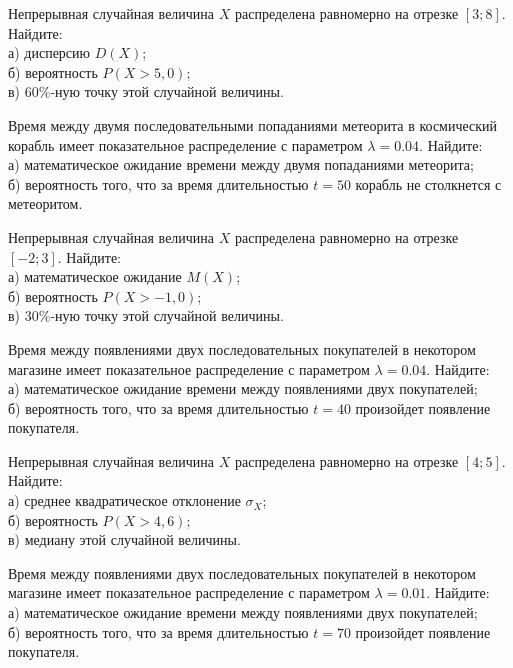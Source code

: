 \vfill

\newpage\setcounter{zad}{0}

\z Непрерывная случайная величина $X$ распределена равномерно на отрезке $[3; 8]$. Найдите: \\ \quad а) дисперсию $D(X)$; \\ \quad б) вероятность $P(X>5{,}0)$; \\ \quad в) $60\%$-ную точку этой случайной величины.


\vfill

\z Время между двумя последовательными попаданиями метеорита в космический корабль имеет показательное распределение с параметром $\lambda = 0.04$. Найдите: \\ \quad а) математическое ожидание времени между двумя попаданиями метеорита; \\ \quad б) вероятность того, что за время длительностью $t = 50$ корабль не столкнется с метеоритом.
 

\vfill

\newpage\setcounter{zad}{0}

\z Непрерывная случайная величина $X$ распределена равномерно на отрезке $[-2; 3]$. Найдите: \\ \quad а) математическое ожидание $M(X)$; \\ \quad б) вероятность $P(X>-1{,}0)$; \\ \quad в) $30\%$-ную точку этой случайной величины.


\vfill

\z Время между появлениями двух последовательных покупателей в некотором магазине имеет показательное распределение с параметром $\lambda = 0.04$. Найдите: \\ \quad а) математическое ожидание времени между появлениями двух покупателей; \\ \quad б) вероятность того, что за время длительностью $t = 40$  произойдет появление покупателя.
 

\vfill

\newpage\setcounter{zad}{0}

\z Непрерывная случайная величина $X$ распределена равномерно на отрезке $[4; 5]$. Найдите: \\ \quad а) среднее квадратическое отклонение $\sigma_X$; \\ \quad б) вероятность $P(X>4{,}6)$; \\ \quad в) медиану этой случайной величины.


\vfill

\z Время между появлениями двух последовательных покупателей в некотором магазине имеет показательное распределение с параметром $\lambda = 0.01$. Найдите: \\ \quad а) математическое ожидание времени между появлениями двух покупателей; \\ \quad б) вероятность того, что за время длительностью $t = 70$  произойдет появление покупателя.
 

